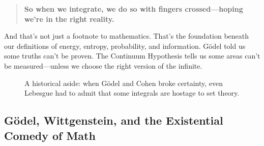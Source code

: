 \begin{quote}
\textbf{So when we integrate, we do so with fingers crossed—hoping we’re in the right reality.}
\end{quote}

And that’s not just a footnote to mathematics. That’s the foundation beneath our definitions of energy, entropy, probability, and information. Gödel told us some truths can’t be proven. The Continuum Hypothesis tells us some areas can’t be measured—unless we choose the right version of the infinite.








\begin{figure}[H]
\centering
{}
\caption{
A historical aside: when Gödel and Cohen broke certainty, even Lebesgue had to admit that some integrals are hostage to set theory.
}
\end{figure}













\subsection{Gödel, Wittgenstein, and the Existential Comedy of Math}

